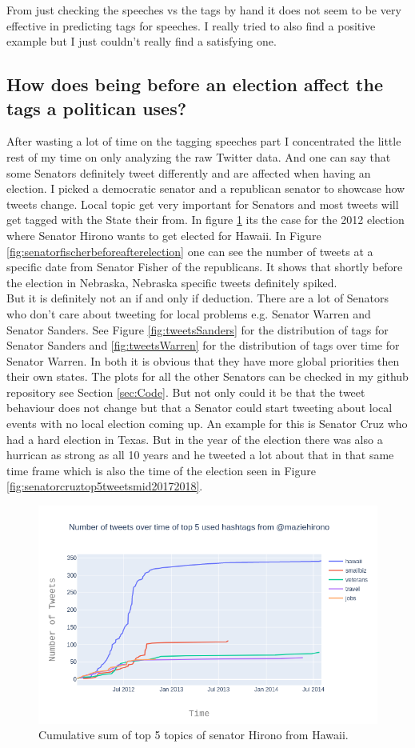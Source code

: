 \documentclass[10pt,conference,compsocconf]{IEEEtran}
\begin{document}
From just checking the speeches vs the tags by hand it does not seem to be very effective in predicting tags for speeches. 
I really tried to also find a positive example but I just couldn't really find a satisfying one.

 
\subsection{How does being before an election affect the tags a politican uses? }
After wasting a lot of time on the tagging speeches part I concentrated the little rest of my time on only analyzing the raw Twitter data. And one can say that some Senators definitely tweet differently and are affected when having an election. I picked a democratic senator and a republican senator to showcase how tweets change. Local topic get very important for Senators and most tweets will get tagged with the State their from. In figure \ref{fig:hironobeforeafterelection} its the case for the 2012 election where Senator Hirono wants to get elected for Hawaii. In Figure \ref{fig:senatorfischerbeforeafterelection} one can see the number of tweets at a specific date from Senator Fisher of the republicans. It shows that shortly before the election in Nebraska, Nebraska specific tweets definitely spiked.\\
But it is definitely not an if and only if deduction. There are a lot of Senators who don't care about tweeting for local problems e.g. Senator Warren and Senator Sanders. See Figure \ref{fig:tweetsSanders} for the distribution of tags for Senator Sanders and \ref{fig:tweetsWarren} for the distribution of tags over time for Senator Warren. In both it is obvious that they have more global priorities then their own states. The plots for all the other Senators can be checked in my github repository see Section \ref{sec:Code}. But not only could it be that the tweet behaviour does not change but that a Senator could start tweeting about local events with no local election coming up. An example for this is Senator Cruz who had a hard election in Texas. But in the year of the election there was also a hurrican as strong as all 10 years and he tweeted a lot about that in that same time frame which is also the time of the election seen in Figure \ref{fig:senatorcruztop5tweetsmid20172018}.
 
\begin{figure}
	\centering
	\includegraphics[width=0.7\linewidth]{images/hirono_before_after_election}
	\caption{Cumulative sum of top 5 topics of senator Hirono from Hawaii. }
	\label{fig:hironobeforeafterelection}
\end{figure}
\end{document}
